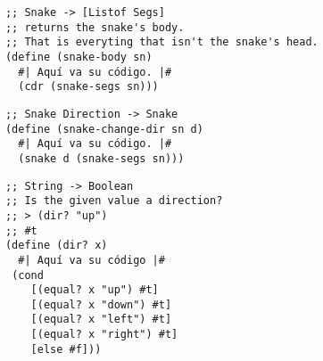 \documentclass[answers]{exam}
\begin{document}
\begin{questions}
  
  \begin{solution}
    \begin{verbatim}
      ;; Snake -> [Listof Segs]
      ;; returns the snake's body.
      ;; That is everyting that isn't the snake's head.
      (define (snake-body sn)
        #| Aquí va su código. |#
        (cdr (snake-segs sn)))
    \end{verbatim}
  \end{solution}
  
  
  \begin{solution}
    \begin{verbatim}
      ;; Snake Direction -> Snake 
      (define (snake-change-dir sn d)
        #| Aquí va su código. |#
        (snake d (snake-segs sn)))
    \end{verbatim}
  \end{solution}
  
  
  \begin{solution}
    \begin{verbatim}
      ;; String -> Boolean
      ;; Is the given value a direction?
      ;; > (dir? "up")
      ;; #t
      (define (dir? x)
        #| Aquí va su código |#
       (cond
          [(equal? x "up") #t]
          [(equal? x "down") #t]
          [(equal? x "left") #t]
          [(equal? x "right") #t]
          [else #f]))
    \end{verbatim}
  \end{solution}
  

\end{questions}
\end{document}
